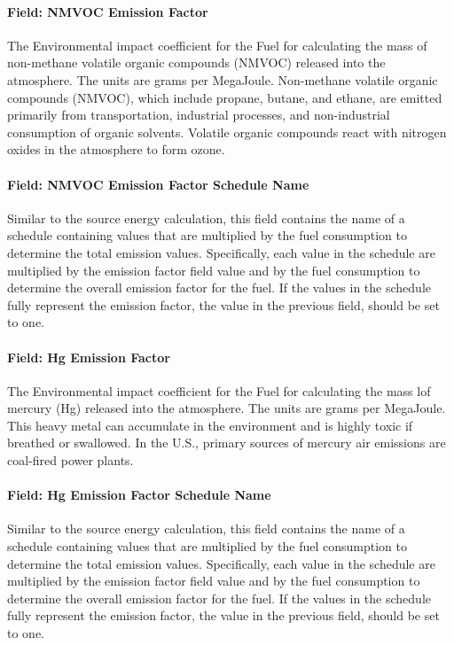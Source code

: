 \paragraph{Field: NMVOC Emission Factor}\label{field-nmvoc-emission-factor}

The Environmental impact coefficient for the Fuel for calculating the mass of non-methane volatile organic compounds (NMVOC) released into the atmosphere. The units are grams per MegaJoule. Non-methane volatile organic compounds (NMVOC), which include propane, butane, and ethane, are emitted primarily from transportation, industrial processes, and non-industrial consumption of organic solvents. Volatile organic compounds react with nitrogen oxides in the atmosphere to form ozone.

\paragraph{Field: NMVOC Emission Factor Schedule Name}\label{field-nmvoc-emission-factor-schedule-name}

Similar to the source energy calculation, this field contains the name of a schedule containing values that are multiplied by the fuel consumption to determine the total emission values. Specifically, each value in the schedule are multiplied by the emission factor field value and by the fuel consumption to determine the overall emission factor for the fuel. If the values in the schedule fully represent the emission factor, the value in the previous field, should be set to one.

\paragraph{Field: Hg Emission Factor}\label{field-hg-emission-factor}

The Environmental impact coefficient for the Fuel for calculating the mass lof mercury (Hg) released into the atmosphere. The units are grams per MegaJoule. This heavy metal can accumulate in the environment and is highly toxic if breathed or swallowed. In the U.S., primary sources of mercury air emissions are coal-fired power plants.

\paragraph{Field: Hg Emission Factor Schedule Name}\label{field-hg-emission-factor-schedule-name}

Similar to the source energy calculation, this field contains the name of a schedule containing values that are multiplied by the fuel consumption to determine the total emission values. Specifically, each value in the schedule are multiplied by the emission factor field value and by the fuel consumption to determine the overall emission factor for the fuel. If the values in the schedule fully represent the emission factor, the value in the previous field, should be set to one.


